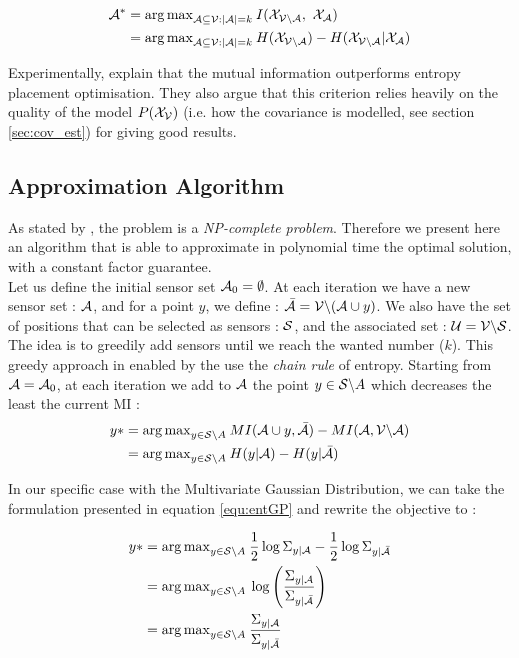 \documentclass[12pt,twoside]{report}
\begin{document}
\begin{align}
	\A^* &= {\arg\max}_{\A \subseteq \V : |\A| = k } \: I(\X_{\VA} , \X_\A) \\
	&= {\arg\max}_{\A \subseteq \V : |\A| = k } \: H(\X_{\VA}) -  H(\X_{\VA} | \X_{\A})
\end{align}


Experimentally, \citet{krause_near-optimal_2008} explain that  the mutual information outperforms entropy placement optimisation. They also argue that this criterion relies heavily on the quality of the model $P(\X_\V)$ (i.e. how the covariance is modelled, see section \ref{sec:cov_est}) for giving good results. 

\subsection{Approximation Algorithm}
 
 As stated by \citet{krause_near-optimal_2008}, the problem is a \textit{NP-complete problem}. Therefore we present here an algorithm that is able to approximate in polynomial time the optimal solution, with a constant factor guarantee. \\
 
 Let us define the initial sensor set $\A_0 = \emptyset$. At each iteration we have a new sensor set : $\A$,  and for a point $y$, we define : $\bar{\A} = \V \backslash ( \A \cup y )$. We also have the set of positions that can be selected as sensors : $\S$,  and the associated set : $\U = \V \backslash \S $. \\
 
 
 The idea is to greedily add sensors until we reach the wanted number ($k$).   This greedy approach in enabled by the use the \textit{chain rule} of entropy.  Starting from $\A = \A_0$, at each iteration we add to $\A$ the point $y \in \S \backslash A $ which decreases the least the current MI : 
\begin{align}
	y* &= {\arg \max}_{y \in \S \backslash A } \: MI(\A \cup y, \bar{\A} ) - MI(\A, \VA) \\
	&= {\arg \max}_{y \in \S \backslash A } \: H(y | \A ) - H(y | \bar{\A} )
\end{align}

In our specific case with the Multivariate Gaussian Distribution, we can take the formulation presented in equation \ref{equ:entGP} and rewrite the objective to : 

\begin{align}
	y*  &= {\arg \max}_{y \in \S \backslash A } \: \frac{1}{2} \log \Sigma_{y | \A} - \frac{1}{2} \log \Sigma_{y | \bar{\A}} \\
	&= {\arg \max}_{y \in \S \backslash A } \: \log \left(\frac{\Sigma_{y | \A}}{\Sigma_{y | \bar{\A}}} \right) \\
	&= {\arg \max}_{y \in \S \backslash A } \: \frac{\Sigma_{y | \A}}{\Sigma_{y | \bar{\A}}}
\end{align}
\end{document}
